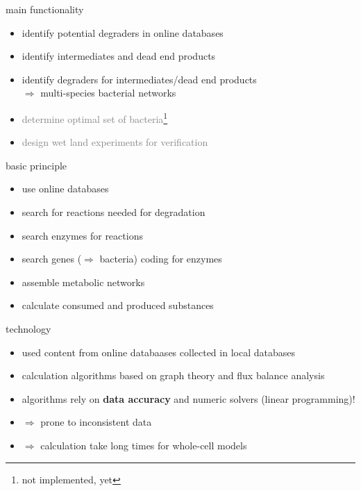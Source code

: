 \documentclass[style=aggie]{powerdot}
\begin{document}
\begin{slide}{main functionality}
\begin{itemize}
 \item identify potential degraders in online databases\newline\pause
 \item identify intermediates and dead end products\newline\pause
 \item identify degraders for intermediates/dead end products\newline\pause \\
 \indent $\Rightarrow$ multi-species bacterial networks\newline\pause
 \item \textcolor{gray}{determine optimal set of bacteria\footnote{not implemented, yet}}\newline\pause
 \item \textcolor{gray}{design wet land experiments for verification\footnotemark[1]}
\end{itemize}

\end{slide}

\begin{slide}{basic principle}
\begin{itemize}
 \item use online databases\newline\pause
 \item search for reactions needed for degradation\newline\pause
 \item search enzymes for reactions\newline\pause
 \item search genes ($\Rightarrow$ bacteria) coding for enzymes\newline\pause
 \item assemble metabolic networks\newline\pause
 \item calculate consumed and produced substances
\end{itemize}
\end{slide}

\begin{slide}{technology}
\begin{itemize}
 \item used content from online databaases collected in local databases\newline\pause
 \item calculation algorithms based on graph theory and flux balance analysis\newline\pause
 \item algorithms rely on \textbf{data accuracy} and numeric solvers (linear programming)!\newline\pause
 \item $\Rightarrow$ prone to inconsistent data\newline\pause
 \item $\Rightarrow$ calculation take long times for whole-cell models
\end{itemize}
\end{slide}
\end{document}
